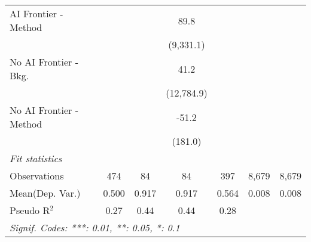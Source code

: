 \begin{tabular}{lcccccc}
   AI Frontier - Method    &              &            & 89.8       &         &       &   \\   
                           &              &            & (9,331.1)  &         &       &   \\   
   No AI Frontier - Bkg.   &              &            & 41.2       &         &       &   \\   
                           &              &            & (12,784.9) &         &       &   \\   
   No AI Frontier - Method &              &            & -51.2      &         &       &   \\   
                           &              &            & (181.0)    &         &       &   \\   
   \midrule
   \emph{Fit statistics}\\
   Observations            & 474          & 84         & 84         & 397     & 8,679 & 8,679\\  
Mean(Dep. Var.) & 0.500 & 0.917 & 0.917 & 0.564 & 0.008 & 0.008 \\
   Pseudo R$^2$            & 0.27         & 0.44       & 0.44       & 0.28    &       & \\  
   \midrule \midrule
   \multicolumn{7}{l}{\emph{Signif. Codes: ***: 0.01, **: 0.05, *: 0.1}}\\
\end{tabular}
\par\endgroup
